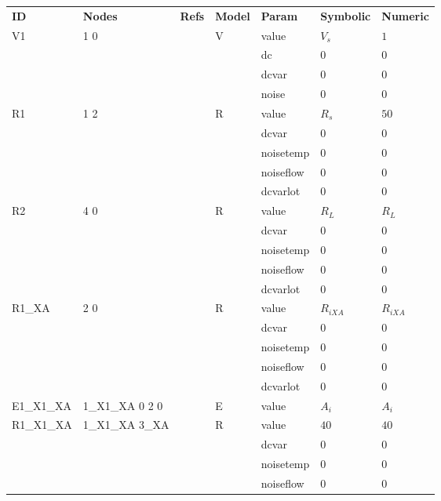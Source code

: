 \begin{table}[H]
\centering
\begin{tabular}[c]{lllllll}
\textbf{ID} & \textbf{Nodes} & \textbf{Refs} & \textbf{Model} & \textbf{Param} & \textbf{Symbolic} & \textbf{Numeric} \\ 
\rowcolor{myyellow}
\small{V1} &\small{1 0 } & &\small{V} &\small{value} &$V_{s}$ &$1$ \\ 
 & & & &\small{dc} &$0$ &$0$ \\ 
\rowcolor{myyellow}
 & & & &\small{dcvar} &$0$ &$0$ \\ 
 & & & &\small{noise} &$0$ &$0$ \\ 
\rowcolor{myyellow}
\small{R1} &\small{1 2 } & &\small{R} &\small{value} &$R_{s}$ &$50$ \\ 
 & & & &\small{dcvar} &$0$ &$0$ \\ 
\rowcolor{myyellow}
 & & & &\small{noisetemp} &$0$ &$0$ \\ 
 & & & &\small{noiseflow} &$0$ &$0$ \\ 
\rowcolor{myyellow}
 & & & &\small{dcvarlot} &$0$ &$0$ \\ 
\small{R2} &\small{4 0 } & &\small{R} &\small{value} &$R_{L}$ &$R_{L}$ \\ 
\rowcolor{myyellow}
 & & & &\small{dcvar} &$0$ &$0$ \\ 
 & & & &\small{noisetemp} &$0$ &$0$ \\ 
\rowcolor{myyellow}
 & & & &\small{noiseflow} &$0$ &$0$ \\ 
 & & & &\small{dcvarlot} &$0$ &$0$ \\ 
\rowcolor{myyellow}
\small{R1\_XA} &\small{2 0 } & &\small{R} &\small{value} &$R_{i XA}$ &$R_{i XA}$ \\ 
 & & & &\small{dcvar} &$0$ &$0$ \\ 
\rowcolor{myyellow}
 & & & &\small{noisetemp} &$0$ &$0$ \\ 
 & & & &\small{noiseflow} &$0$ &$0$ \\ 
\rowcolor{myyellow}
 & & & &\small{dcvarlot} &$0$ &$0$ \\ 
\small{E1\_X1\_XA} &\small{1\_X1\_XA 0 2 0 } & &\small{E} &\small{value} &$A_{i}$ &$A_{i}$ \\ 
\rowcolor{myyellow}
\small{R1\_X1\_XA} &\small{1\_X1\_XA 3\_XA } & &\small{R} &\small{value} &$40$ &$40$ \\ 
 & & & &\small{dcvar} &$0$ &$0$ \\ 
\rowcolor{myyellow}
 & & & &\small{noisetemp} &$0$ &$0$ \\ 
 & & & &\small{noiseflow} &$0$ &$0$ \\ 

\end{tabular}
\end{table}
